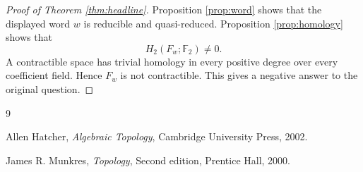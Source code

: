 \documentclass[12pt]{article}
\newcommand{\Ftwo}{\mathbb{F}_2}
\theoremstyle{definition}
\begin{document}
\begin{proof}[Proof of Theorem \ref{thm:headline}]
Proposition \ref{prop:word} shows that the displayed word \(w\) is reducible and quasi-reduced.  Proposition \ref{prop:homology} shows that
\[
H_2(F_w;\Ftwo)\neq 0.
\]
A contractible space has trivial homology in every positive degree over every coefficient field.  Hence \(F_w\) is not contractible.  This gives a negative answer to the original question.
\end{proof}

\begin{thebibliography}{9}

Allen Hatcher,
\emph{Algebraic Topology},
Cambridge University Press, 2002.

James R. Munkres,
\emph{Topology},
Second edition,
Prentice Hall, 2000.

\end{thebibliography}
\end{document}
